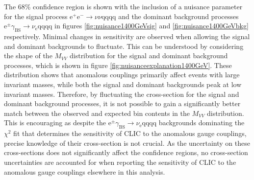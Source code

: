 The 68\% confidence region is shown with the inclusion of a nuisance parameter for the signal process $\text{e}^{+}\text{e}^{-} \rightarrow \nu{\nu}\text{qqqq}$ and the dominant background processes $\text{e}^{\pm}\gamma_{\text{BS}} \rightarrow \nu_{\text{e}}\text{qqqq}$ in figures \ref{fig:nuisance1400GeVsig} and \ref{fig:nuisance1400GeVbkg} respectively.  Minimal changes in sensitivity are observed when allowing the signal and dominant backgrounds to fluctuate.  This can be understood by considering the shape of the $M_{VV}$ distribution for the signal and dominant background processes, which is shown in figure \ref{fig:nuisanceexplanation1400GeV}.  These distribution shows that anomalous couplings primarily affect events with large invariant masses, while both the signal and dominant backgrounds peak at low invariant masses.  Therefore, by fluctuating the cross-section for the signal and dominant background processes, it is not possible to gain a significantly better match between the observed and expected bin contents in the $M_{VV}$ distribution.  This is encouraging as despite the $\text{e}^{\pm}\gamma_{\text{BS}} \rightarrow \nu_{\text{e}}\text{qqqq}$ backgrounds dominating the $\chi^{2}$ fit that determines the sensitivity of CLIC to the anomalous gauge couplings, precise knowledge of their cross-section is not crucial.  As the uncertainty on these cross-sections does not significantly affect the confidence regions, no cross-section uncertainties are accounted for when reporting the sensitivity of CLIC to the anomalous gauge couplings elsewhere in this analysis.   

